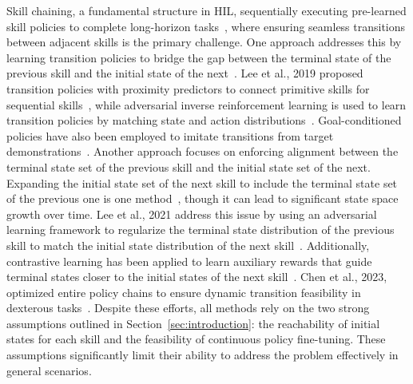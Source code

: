 Skill chaining, a fundamental structure in HIL, sequentially executing pre-learned skill policies to complete long-horizon tasks~\cite{konidaris2009skill, garrett2021integrated, guo2023recent, ahn2022can, singh2023progprompt, du2023video}, where ensuring seamless transitions between adjacent skills is the primary challenge. One approach addresses this by learning transition policies to bridge the gap between the terminal state of the previous skill and the initial state of the next~\cite{lee2019composing, byun2021training, watahiki2022one}. Lee et al., 2019 proposed transition policies with proximity predictors to connect primitive skills for sequential skills~\cite{lee2019composing}, while adversarial inverse reinforcement learning is used to learn transition policies by matching state and action distributions~\cite{byun2021training}. Goal-conditioned policies have also been employed to imitate transitions from target demonstrations~\cite{watahiki2022one}. Another approach focuses on enforcing alignment between the terminal state set of the previous skill and the initial state set of the next. Expanding the initial state set of the next skill to include the terminal state set of the previous one is one method~\cite{clegg2018learning}, though it can lead to significant state space growth over time. Lee et al., 2021 address this issue by using an adversarial learning framework to regularize the terminal state distribution of the previous skill to match the initial state distribution of the next skill~\cite{lee2021adversarial}. Additionally, contrastive learning has been applied to learn auxiliary rewards that guide terminal states closer to the initial states of the next skill~\cite{li2024auxiliary}. Chen et al., 2023, optimized entire policy chains to ensure dynamic transition feasibility in dexterous tasks~\cite{chen2023sequential}. Despite these efforts, all methods rely on the two strong assumptions outlined in Section~\ref{sec:introduction}: the reachability of initial states for each skill and the feasibility of continuous policy fine-tuning. These assumptions significantly limit their ability to address the \pb problem effectively in general scenarios.


